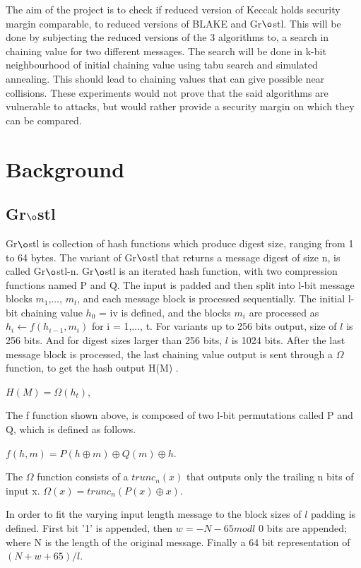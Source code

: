 \documentclass[12pt]{artikel3}                  %
\begin{document}
The aim of the project is to check if reduced version of Keccak holds security margin comparable, to reduced
versions of BLAKE and Gr$\o$stl. This will be done by subjecting the reduced versions of the 3 algorithms
to, a search in chaining value for two different messages. The search will be done in k-bit neighbourhood of
initial chaining value using tabu search and simulated annealing. This should lead to chaining values that can
give possible near collisions. These experiments would not prove that the said algorithms are vulnerable to 
attacks, but would rather provide a security margin on which they can be compared.
 
\clearpage

\section{Background}

\subsection{Gr$\o$stl}

Gr$\o$stl is collection of hash functions which produce digest size, ranging from 1 to 64 bytes. The variant of
Gr$\o$stl that returns a message digest of size n, is called Gr$\o$stl-n. Gr$\o$stl is an iterated hash function, 
with two compression functions named P and Q. The input is padded and then split into l-bit message blocks
$m_{1}$,$\ldots$, $m_{t}$, and each message block is processed sequentially. The initial l-bit chaining value 
$h_{0}$ = iv is defined, and the blocks $m_{i}$ are processed as $ h_{i}\gets f(h_{i-1}, m_{i})$ for i = 1,$\ldots$,
t. For variants up to 256 bits output, size of $l$ is 256 bits. And for digest sizes larger than 256 bits, $l$ 
is 1024 bits. After the last message block is processed, the last chaining value output is sent through a 
$\Omega$ function, to get the hash output H(M) \cite{00019}. 

$H(M) = \Omega(h_{t}),$

The f function shown above, is composed of two l-bit permutations called P and Q, which is defined as follows.

$f(h, m) = P(h \oplus m) \oplus Q(m) \oplus h.$

The $\Omega$ function consists of a $trunc_{n}(x)$ that outputs only the trailing n bits of input x. 
$\Omega(x) = trunc_{n}( P(x) \oplus x ).$

In order to fit the varying input length message to the block sizes of $ l $ padding is defined. First bit '1' is
appended, then $ w = -N - 65 mod l $ 0 bits are appended; where N is the length of the original message. Finally a
64 bit representation of $(N + w + 65) / l $.
\end{document}
